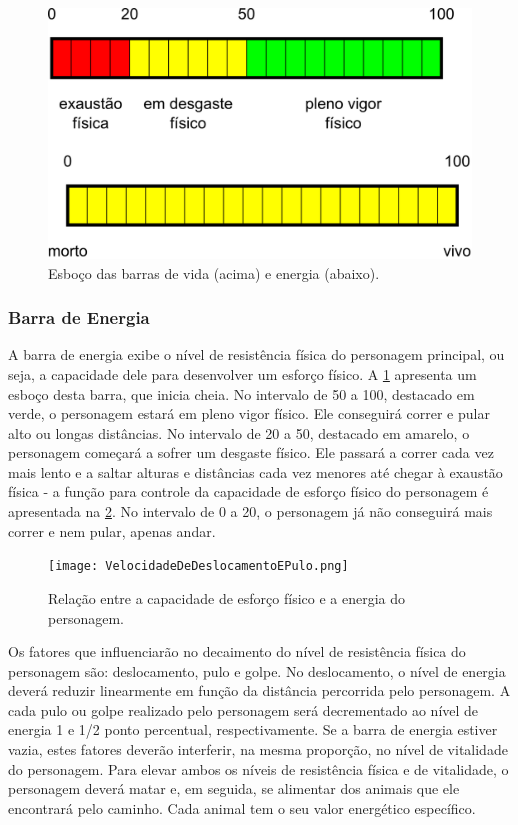 \begin{figure}[H]
 \centering
 \includegraphics[scale=0.3]{BarraDeEnergia.png}
 \caption{Esboço das barras de vida (acima) e energia (abaixo).}
 \label{img:energia}
\end{figure}

\subsubsection{Barra de Energia}
A barra de energia exibe o nível de resistência física do personagem principal, 
ou seja, a capacidade dele para desenvolver um esforço físico. A \ref{img:energia} 
apresenta um esboço desta barra, que inicia cheia. No intervalo de 50 a 100, destacado em 
verde, o personagem estará em pleno vigor físico. Ele conseguirá correr e pular 
alto ou longas distâncias. No intervalo de 20 a 50, destacado em amarelo, o 
personagem começará a sofrer um desgaste físico. Ele passará a correr cada vez 
mais lento e a saltar alturas e distâncias cada vez menores até chegar à exaustão 
física - a função para controle da capacidade de esforço físico do personagem é 
apresentada na \ref{img:velocidade}. No intervalo de 0 a 20, o personagem já não conseguirá 
mais correr e nem pular, apenas andar.

\begin{figure}[H]
 \centering
 \texttt{[image: VelocidadeDeDeslocamentoEPulo.png]}
 \caption{Relação entre a capacidade de esforço físico e a energia
do personagem.}
 \label{img:velocidade}
\end{figure}

Os fatores que influenciarão no decaimento do nível de resistência física 
do personagem são: deslocamento, pulo e golpe. No deslocamento, o nível de 
energia deverá reduzir linearmente em função da distância percorrida pelo 
personagem. A cada pulo ou golpe realizado pelo personagem será decrementado 
ao nível de energia 1 e 1/2 ponto percentual, respectivamente. Se a barra de 
energia estiver vazia, estes fatores deverão interferir, na mesma proporção, 
no nível de vitalidade do personagem. Para elevar ambos os níveis de 
resistência física e de vitalidade, o personagem deverá matar e, em 
seguida, se alimentar dos animais que ele encontrará pelo caminho. Cada 
animal tem o seu valor energético específico.

